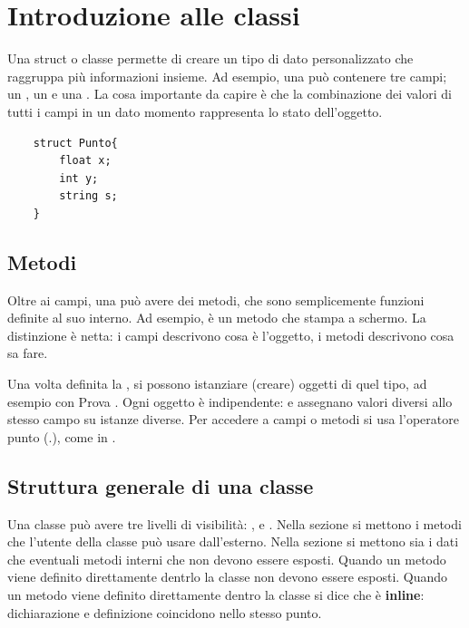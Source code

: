 


\intro{}



\section{Introduzione alle classi}
Una struct o classe permette di creare un tipo di dato personalizzato che raggruppa più informazioni insieme. Ad esempio, una  può contenere tre campi; un , un  e una  . La cosa importante da capire è che la combinazione dei valori di tutti i campi in un dato momento rappresenta lo stato dell'oggetto. 
\begin{codebox}
    \begin{lstlisting}
    struct Punto{
        float x;
        int y;
        string s;
    }
    \end{lstlisting}
\end{codebox}
\subsection{Metodi}
Oltre ai campi, una  può avere dei metodi, che sono semplicemente funzioni definite al suo interno. Ad esempio,  è un metodo che stampa  a schermo. La distinzione è netta: i campi descrivono cosa è l'oggetto, i metodi descrivono cosa sa fare.

Una volta definita la , si possono istanziare (creare) oggetti di quel tipo, ad esempio con Prova . Ogni oggetto è indipendente:  e  assegnano valori diversi allo stesso campo su istanze diverse. Per accedere a campi o metodi si usa l'operatore punto (.), come in .




\subsection{Struttura generale di una classe}
Una classe può avere tre livelli di visibilità: ,  e .  Nella sezione  si mettono i metodi che l'utente della classe può usare dall'esterno. Nella sezione  si mettono sia i dati che eventuali metodi interni che non devono essere esposti. Quando un metodo viene definito direttamente dentrlo la classe non devono essere esposti. Quando un metodo viene definito direttamente dentro la classe si dice che è \textbf{inline}: dichiarazione e definizione coincidono nello stesso punto.

